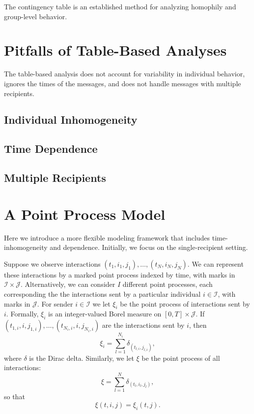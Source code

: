 \documentclass[aoas,preprint]{imsart}
\begin{document}
The contingency table is an established method for analyzing homophily and
group-level behavior.

\section{Pitfalls of Table-Based Analyses}

The table-based analysis does not account for variability in individual
behavior, ignores the times of the messages, and does not handle messages with
multiple recipients.

\subsection{Individual Inhomogeneity}
\subsection{Time Dependence}
\subsection{Multiple Recipients}


\section{A Point Process Model}

Here we introduce a more flexible modeling framework that includes time-inhomogeneity and dependence.  Initially, we focus on the single-recipient setting.

Suppose we observe interactions $(t_1, i_1, j_1), \ldots, (t_N, i_N, j_N)$. We
can represent these interactions by a marked point process indexed by time,
with marks in $\mathcal{I} \times \mathcal{J}$. Alternatively, we can consider
$I$ different point processes, each corresponding the the interactions sent by
a particular individual $i \in \mathcal{I}$, with marks in $\mathcal{J}$. For
sender $i \in \mathcal{I}$ we let $\xi_i$ be the point process of interactions
sent by $i$. Formally, $\xi_i$ is an integer-valued Borel measure on $[0,T]
\times \mathcal{J}$. If $(t_{1,i}, i, j_{1,i}), \ldots, (t_{N_i, i}, i,
j_{N_i,i})$ are the interactions sent by $i$, then
\[
    \xi_i = \sum_{l=1}^{N_i} \delta_{(t_{l,i}, j_{l,i})},
\]
where $\delta$ is the Dirac delta.  Similarly, we let $\xi$ be the point
process of all interactions:
\[
    \xi = \sum_{l=1}^{N} \delta_{(t_l, i_l, j_l)},
\]
so that
\[
    \xi(t, i, j) = \xi_i(t, j).
\]
\end{document}
